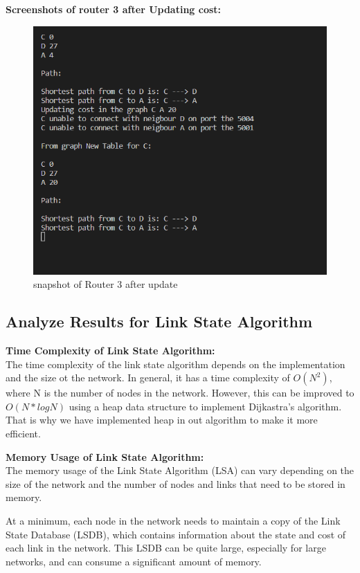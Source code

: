 \documentclass[11pt]{article}
\begin{document}
\textbf{Screenshots of router 3 after Updating cost: }\\[12pt]
 \begin{figure}[!h]
\centering
\includegraphics[width=\textwidth]{r3u.png}
\caption{snapshot of Router 3 after update}
\end{figure}
\FloatBarrier

 \subsection{Analyze Results for Link State Algorithm}
 
\textbf{Time Complexity of Link State Algorithm: }\\[12pt]
The time complexity of the link state algorithm depends on the implementation and the size ot the network. In general, it has a time complexity of $O(N^2)$, where N is the number of nodes in the network. However, this can be improved to $O(N * logN)$ using a heap data structure to implement Dijkastra's algorithm. That is why we have implemented heap in out algorithm to make it more efficient.

 \textbf{Memory Usage of Link State Algorithm: }\\[12pt]
 The memory usage of the Link State Algorithm (LSA) can vary depending on the size of the network and the number of nodes and links that need to be stored in memory.

 At a minimum, each node in the network needs to maintain a copy of the Link State Database (LSDB), which contains information about the state and cost of each link in the network. This LSDB can be quite large, especially for large networks, and can consume a significant amount of memory.
\end{document}
